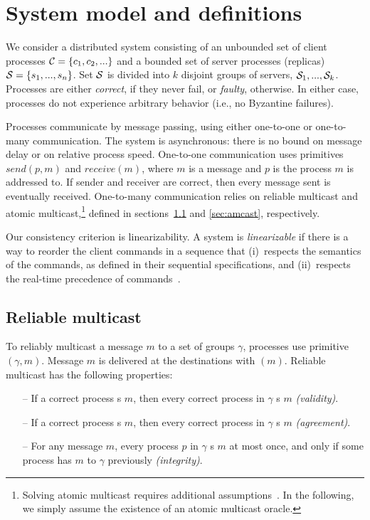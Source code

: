 \section{System model and definitions}
\label{sec:sysmodel}

We consider a distributed system consisting of an unbounded set of client processes $\mathcal{C} = \{c_1, c_2, ...\}$ and a bounded set of server processes (replicas) $\mathcal{S} = \{s_1, ..., s_n\}$. 
Set $\mathcal{S}$ is divided into $k$ disjoint groups of servers, $\mathcal{S}_1, ..., \mathcal{S}_k$.
Processes are either \emph{correct}, if they never fail, or \emph{faulty}, otherwise. 
In either case, processes do not experience arbitrary behavior (i.e., no Byzantine failures).

Processes communicate by message passing, using either one-to-one or one-to-many communication.
The system is asynchronous: there is no bound on message delay or on relative process speed.
One-to-one communication uses primitives $send(p,m)$ and $receive(m)$, where $m$ is a message and $p$ is the process $m$ is addressed to. 
If sender and receiver are correct, then every message sent is eventually received. 
%
One-to-many communication relies on reliable multicast and atomic multicast,\footnote{Solving atomic multicast requires additional assumptions~\cite{CT96,FLP85}. In the following, we simply assume the existence of an atomic multicast oracle.}
defined in sections~\ref{sec:rmcast} and \ref{sec:amcast}, respectively.

Our consistency criterion is linearizability.
A system is \emph{linearizable} if there is a way to reorder the client commands in a sequence that (i)~respects the semantics of the commands, as defined in their sequential specifications, and (ii)~respects the real-time precedence of commands~\cite{Attiya04}.

\subsection{Reliable multicast}
\label{sec:rmcast}

To reliably multicast a message $m$ to a set of groups $\gamma$, processes use primitive \rmcast$(\gamma, m)$.
Message $m$ is delivered at the destinations with \rmdel$(m)$.
Reliable multicast has the following properties:

\begin{itemize}

    \item[--] If a correct process \rmcast{}s $m$, then every correct process in $\gamma$ \rmdel{}s $m$ \emph{(validity)}.
    
    \item[--] If a correct process \rmdel{}s $m$, then every correct process in $\gamma$ \rmdel{}s $m$ \emph{(agreement)}.
    
    \item[--] For any message $m$, every process $p$ in $\gamma$ \rmdel{}s $m$ at most once, and only if some process has \rmcast{} $m$  to $\gamma$ previously \emph{(integrity)}.
    
\end{itemize}

